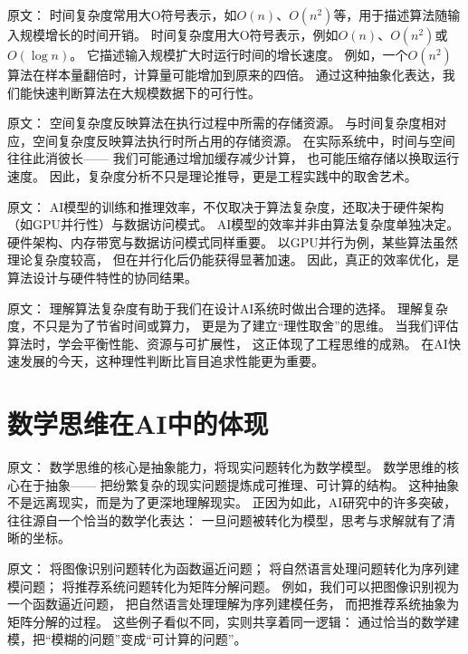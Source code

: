 原文：
时间复杂度常用大O符号表示，如$O(n)$、$O(n^2)$等，用于描述算法随输入规模增长的时间开销。
时间复杂度用大O符号表示，例如$O(n)$、$O(n^2)$或$O(\log n)$。  
它描述输入规模扩大时运行时间的增长速度。  
例如，一个$O(n^2)$算法在样本量翻倍时，计算量可能增加到原来的四倍。  
通过这种抽象化表达，我们能快速判断算法在大规模数据下的可行性。



原文：
空间复杂度反映算法在执行过程中所需的存储资源。
与时间复杂度相对应，空间复杂度反映算法执行时所占用的存储资源。  
在实际系统中，时间与空间往往此消彼长——  
我们可能通过增加缓存减少计算，  
也可能压缩存储以换取运行速度。  
因此，复杂度分析不只是理论推导，更是工程实践中的取舍艺术。



原文：
AI模型的训练和推理效率，不仅取决于算法复杂度，还取决于硬件架构（如GPU并行性）与数据访问模式。
AI模型的效率并非由算法复杂度单独决定。  
硬件架构、内存带宽与数据访问模式同样重要。  
以GPU并行为例，某些算法虽然理论复杂度较高，  
但在并行化后仍能获得显著加速。  
因此，真正的效率优化，是算法设计与硬件特性的协同结果。



原文：
理解算法复杂度有助于我们在设计AI系统时做出合理的选择。
理解复杂度，不只是为了节省时间或算力，  
更是为了建立“理性取舍”的思维。  
当我们评估算法时，学会平衡性能、资源与可扩展性，  
这正体现了工程思维的成熟。  
在AI快速发展的今天，这种理性判断比盲目追求性能更为重要。

\section{数学思维在AI中的体现}

原文：
数学思维的核心是抽象能力，将现实问题转化为数学模型。
数学思维的核心在于抽象——  
把纷繁复杂的现实问题提炼成可推理、可计算的结构。  
这种抽象不是远离现实，而是为了更深地理解现实。  
正因为如此，AI研究中的许多突破，往往源自一个恰当的数学化表达：  
一旦问题被转化为模型，思考与求解就有了清晰的坐标。



原文：
将图像识别问题转化为函数逼近问题；  
将自然语言处理问题转化为序列建模问题；  
将推荐系统问题转化为矩阵分解问题。
例如，我们可以把图像识别视为一个函数逼近问题，  
把自然语言处理理解为序列建模任务，  
而把推荐系统抽象为矩阵分解的过程。  
这些例子看似不同，实则共享着同一逻辑：  
通过恰当的数学建模，把“模糊的问题”变成“可计算的问题”。



